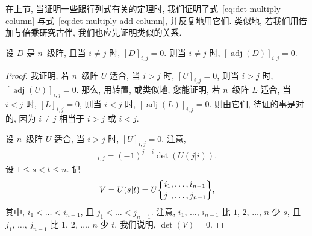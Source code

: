 \documentclass[../libro.tex]{subfiles}
\begin{document}
在上节, 当证明一些跟行列式有关的定理时,
我们证明了式~\eqref{eq:det-multiply-column}
与式~\eqref{eq:det-multiply-add-column},
并反复地用它们.
类似地, 若我们用倍加与倍乘研究古伴,
我们也应先证明类似的关系.

\begin{theorem}
    设 \(D\) 是 \(n\)~级阵,
    且当 \(i \neq j\) 时, \([D]_{i,j} = 0\).
    则当 \(i \neq j\) 时,
    \([\operatorname{adj} {(D)}]_{i,j} = 0\).
\end{theorem}

\begin{proof}
    我证明, 若 \(n\)~级阵 \(U\) 适合,
    当 \(i > j\) 时, \([U]_{i,j} = 0\),
    则当 \(i > j\) 时,
    \([\operatorname{adj} {(U)}]_{i,j} = 0\).
    那么, 用转置, 或类似地,
    您能证明,
    若 \(n\)~级阵 \(L\) 适合,
    当 \(i < j\) 时, \([L]_{i,j} = 0\),
    则当 \(i < j\) 时,
    \([\operatorname{adj} {(L)}]_{i,j} = 0\).
    则由它们, 待证的事是对的,
    因为 \(i \neq j\) 相当于
    \(i > j\) 或 \(i < j\).

    设 \(n\)~级阵 \(U\) 适合,
    当 \(i > j\) 时, \([U]_{i,j} = 0\).
    注意,
    \begin{align*}
        [\operatorname{adj} {(U)}]_{i,j}
        = (-1)^{j+i} \det {(U(j|i))}.
    \end{align*}
    设 \(1 \leq s < t \leq n\).
    记
    \begin{align*}
        V = U(s|t)
        = U\submat{i_1,\dots,i_{n-1}}{j_1,\dots,j_{n-1}},
    \end{align*}
    其中,
    \(i_1 < \dots < i_{n-1}\),
    且 \(j_1 < \dots < j_{n-1}\).
    注意, \(i_1\), \(\dots\), \(i_{n-1}\)
    比 \(1\), \(2\), \(\dots\), \(n\) 少 \(s\),
    且 \(j_1\), \(\dots\), \(j_{n-1}\)
    比 \(1\), \(2\), \(\dots\), \(n\) 少 \(t\).
    我们说明, \(\det {(V)} = 0\).


\end{proof}
\end{document}
